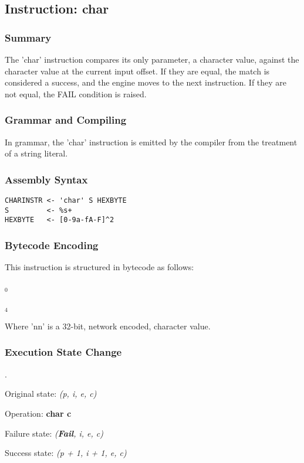 \subsection{Instruction: char}

\subsubsection{Summary}

The 'char' instruction compares its only parameter, a character value,
against the character value at the current input offset. If they are
equal, the match is considered a success, and the engine moves to the
next instruction. If they are not equal, the FAIL condition is raised.

\subsubsection{Grammar and Compiling}

In grammar, the 'char' instruction is emitted by the compiler from
the treatment of a string literal.

\subsubsection{Assembly Syntax}

\begin{myquote}
\begin{verbatim}
CHARINSTR <- 'char' S HEXBYTE
S         <- %s+
HEXBYTE   <- [0-9a-fA-F]^2

\end{verbatim}
\end{myquote}
\subsubsection{Bytecode Encoding}

This instruction is structured in bytecode as follows:

$_0$\ 


$_4$\

Where 'nn' is a 32-bit, network encoded, character value.

\subsubsection{Execution State Change}

.

Original state: \textit{(p, i, e, c)}

Operation: \textbf{char c}

Failure state: \textit{(\textbf{Fail}, i, e, c)}

Success state: \textit{(p + 1, i + 1, e, c)}

